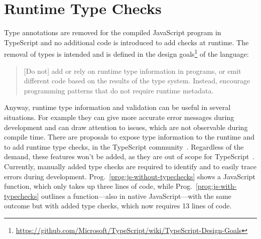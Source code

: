 \section{Runtime Type Checks}
\label{sec:runtime-type-checks}


Type annotations are removed for the compiled JavaScript program in TypeScript and no additional code is introduced to add checks at runtime. The removal of types is intended and is defined in the design goals\footnote{\url{https://github.com/Microsoft/TypeScript/wiki/TypeScript-Design-Goals}} of the language:
\begin{quote}
  [Do not] add or rely on runtime type information in programs,
  or emit different code based on the results of the type system.
  Instead, encourage programming patterns that do not require runtime metadata.~\cite{TypeScriptWiki:DesignGoals}
\end{quote}
Anyway, runtime type information and validation can be useful in several situations. 
For example they can give more accurate error messages during development and can 
draw attention to issues, which are not observable during compile time.
There are proposals to expose type information to the runtime and to add runtime type
checks, in the TypeScript community~\cites{TypeScriptIssue:RuntimeTypeChecking, TypeScriptIssue:RuntimeTypeChecks, TypeScriptIssue:EmitTypeArguments}. Regardless of the demand, these features won't be added, as they are out of scope
for TypeScript~\cite{TypeScriptIssue:RuntimeTypeChecking:Comment:OutOfScope, TypeScriptIssue:EmitTypeArguments:Comment:OutOfScope}.
Currently, manually added type checks are required to identify and to easily trace errors during development. Prog.~\ref{prog:js-without-typechecks} shows a JavaScript function, which only takes up three lines of code, while Prog.~\ref{prog:js-with-typechecks} outlines a function---also in native JavaScript---with the same outcome but with added type checks, which now requires 13 lines of code.

